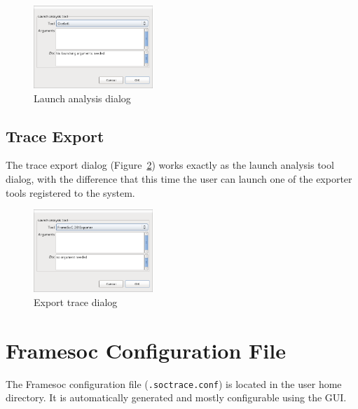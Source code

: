 \documentclass[twoside]{article}
\begin{document}
\begin{sloppypar}
\begin{figure}[h!]
  \centering
    \includegraphics[width=0.4\textwidth]{images/analysis_dialog.png}
  \caption{Launch analysis dialog}
  \label{fig:analysis_dialog}
\end{figure}

\subsection{Trace Export }
\label{subsec:export}


The  trace export dialog (Figure~\ref{fig:export_dialog}) works exactly as the launch analysis tool dialog, with the difference that this time the user can launch one of the exporter tools registered to the system.

\begin{figure}[h!]
  \centering
    \includegraphics[width=0.4\textwidth]{images/export_dialog.png}
  \caption{Export trace dialog}
  \label{fig:export_dialog}
\end{figure}

\newpage

\appendix

\section{Framesoc Configuration File}
\label{app:conf}

The Framesoc configuration file (\texttt{.soctrace.conf}) is located in the user home directory.
It is automatically generated and mostly configurable using the GUI.


\end{sloppypar}
\end{document}

